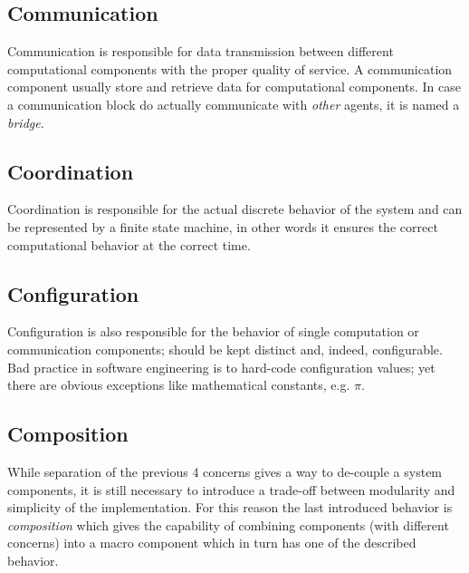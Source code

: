 \subsection{Communication}
Communication is responsible for data transmission between different computational components with the proper quality of service. A communication component usually store and retrieve data for computational components. In case a communication block do actually communicate with \emph{other} agents, it is named a \emph{bridge}.
\subsection{Coordination}
Coordination is responsible for the actual discrete behavior of the system and can be represented by a finite state machine, in other words it ensures the correct computational behavior at the correct time.
\subsection{Configuration}
Configuration is also responsible for the behavior of single computation or communication components; should be kept distinct and, indeed, configurable. Bad practice in software engineering is to hard-code configuration values; yet there are obvious exceptions like mathematical constants, e.g. $\pi$.
\subsection{Composition}
While separation of the previous 4 concerns gives a way to de-couple a system components, it is still necessary to introduce a trade-off between modularity and simplicity of the implementation. For this reason the last introduced behavior is \emph{composition} which gives the capability of combining components (with different concerns) into a macro component which in turn has one of the described behavior.




